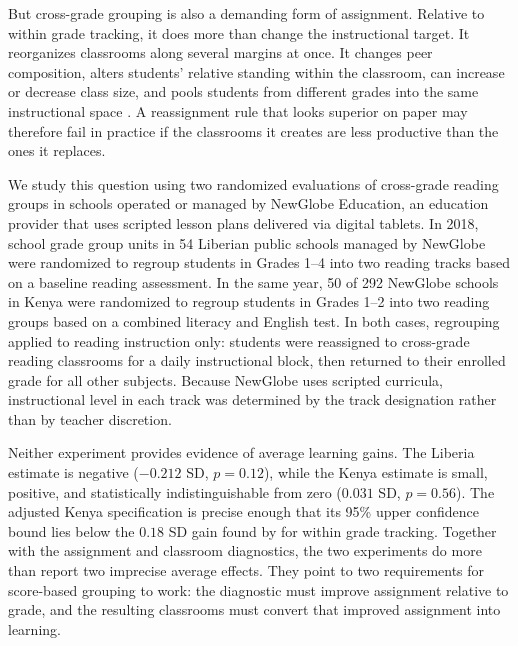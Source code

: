 \documentclass[11pt]{article}
\begin{document}
But cross-grade grouping is also a demanding form of assignment. Relative to within grade tracking, it does more than change the instructional target. It reorganizes classrooms along several margins at once. It changes peer composition, alters students' relative standing within the classroom, can increase or decrease class size, and pools students from different grades into the same instructional space \citep{betts:2011}. A reassignment rule that looks superior on paper may therefore fail in practice if the classrooms it creates are less productive than the ones it replaces.

We study this question using two randomized evaluations of cross-grade reading groups in schools operated or managed by NewGlobe Education, an education provider that uses scripted lesson plans delivered via digital tablets. In 2018, school grade group units in 54 Liberian public schools managed by NewGlobe were randomized to regroup students in Grades 1--4 into two reading tracks based on a baseline reading assessment. In the same year, 50 of 292 NewGlobe schools in Kenya were randomized to regroup students in Grades 1--2 into two reading groups based on a combined literacy and English test. In both cases, regrouping applied to reading instruction only: students were reassigned to cross-grade reading classrooms for a daily instructional block, then returned to their enrolled grade for all other subjects. Because NewGlobe uses scripted curricula, instructional level in each track was determined by the track designation rather than by teacher discretion.

Neither experiment provides evidence of average learning gains. The Liberia estimate is negative ($-0.212$ SD, $p = 0.12$), while the Kenya estimate is small, positive, and statistically indistinguishable from zero ($0.031$ SD, $p = 0.56$). The adjusted Kenya specification is precise enough that its 95\% upper confidence bound lies below the $0.18$ SD gain found by \citet{duflo2011peer} for within grade tracking. Together with the assignment and classroom diagnostics, the two experiments do more than report two imprecise average effects. They point to two requirements for score-based grouping to work: the diagnostic must improve assignment relative to grade, and the resulting classrooms must convert that improved assignment into learning.
\end{document}
